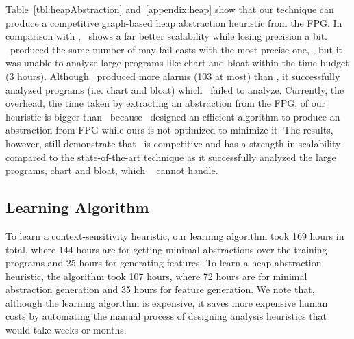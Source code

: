 Table~\ref{tbl:heapAbstraction} and~\ref{appendix:heap} show that our technique can produce a competitive graph-based heap abstraction heuristic from the FPG.
In comparison with \Mahjong, \OurCtx~shows a far better scalability while losing precision a bit.
\Mahjong~produced the same number of may-fail-casts with the most precise one, \AllocBased,
but it was unable to analyze large programs like {chart} and {bloat} within the time budget (3 hours).
Although \OurCtx~produced more alarms (103 at most) than \Mahjong, it successfully analyzed programs (i.e. chart and bloat) which \Mahjong~failed to analyze.
Currently, the overhead, the time taken by extracting an abstraction from the FPG, of our heuristic is bigger than \Mahjong~because \Mahjong~designed an efficient algorithm to produce an abstraction from FPG while ours is not optimized to minimize it. %
The results, however, still demonstrate that \OurCtx~is competitive and has a strength in scalability compared to the state-of-the-art technique as it successfully analyzed the large programs, {chart} and {bloat}, which \Mahjong~ cannot handle.



\subsection{Learning Algorithm}\label{sec:learning_alg}


To learn a context-sensitivity heuristic, our learning algorithm took 169 hours in total, where 144 hours are for getting minimal abstractions over the training programs and 25 hours for generating features.
To learn a heap abstraction heuristic, the algorithm took 107 hours, where 72 hours are for minimal abstraction generation and 35 hours for feature generation.
We note that, although the learning algorithm is expensive, it saves more expensive human costs by automating the manual process of designing analysis heuristics that would take weeks or months.


